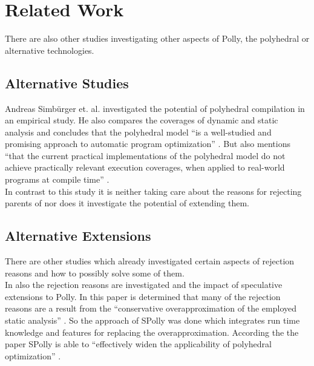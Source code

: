 \chapter{Related Work}
There are also other studies investigating other aspects of Polly, the polyhedral or alternative technologies.

\section{Alternative Studies}
Andreas Simbürger et. al. \cite{PolyhedralEmpiricalStudy} investigated the potential of polyhedral compilation in an empirical study.
He also compares the coverages of dynamic and static analysis and concludes that the polyhedral model \enquote{is a well-studied and promising approach to automatic program optimization} \cite{PolyhedralEmpiricalStudy}.
But also mentions \enquote{that the current practical implementations of the polyhedral model do not achieve practically relevant execution coverages, when applied to real-world programs at compile time} \cite{PolyhedralEmpiricalStudy}.\\
In contrast to this study it is neither taking care about the reasons for rejecting parents of \scops nor does it investigate the potential of extending them.

\section{Alternative Extensions}\label{sec:altExt}
There are other studies which already investigated certain aspects of rejection reasons and how to possibly solve some of them.\\
In \cite{spolly} also the rejection reasons are investigated and the impact of speculative extensions to Polly.
In this paper is determined that many of the rejection reasons are a result from the \enquote{conservative overapproximation of the employed static analysis} \cite{spolly}.
So the approach of SPolly was done which integrates run time knowledge and features for replacing the overapproximation.
According the the paper SPolly is able to \enquote{effectively widen the applicability of polyhedral optimization} \cite{spolly}.

